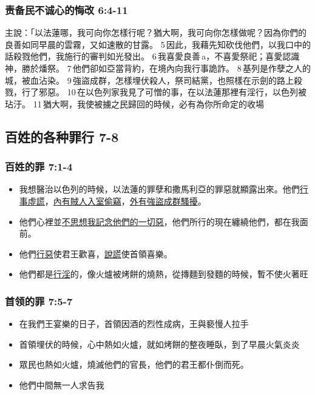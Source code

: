 \subsubsection{责备民不诚心的悔改 6:4-11}
主說：「以法蓮哪，我可向你怎樣行呢？猶大啊，我可向你怎樣做呢？因為你們的良善如同早晨的雲霧，又如速散的甘露。 5 因此，我藉先知砍伐他們，以我口中的話殺戮他們，我施行的審判如光發出。 6 我喜愛良善 a，不喜愛祭祀；喜愛認識神，勝於燔祭。 7 他們卻如亞當背約，在境內向我行事詭詐。 8 基列是作孽之人的城，被血沾染。 9 強盜成群，怎樣埋伏殺人，祭司結黨，也照樣在示劍的路上殺戮，行了邪惡。 10 在以色列家我見了可憎的事，在以法蓮那裡有淫行，以色列被玷汙。 11 猶大啊，我使被擄之民歸回的時候，必有為你所命定的收場


\subsection{百姓的各种罪行 7-8}
\subsubsection{百姓的罪 7:1-4}
\begin{itemize}
\itemsep-.45em  
\item 我想醫治以色列的時候，以法蓮的罪孽和撒馬利亞的罪惡就顯露出來。他們\underline{行事虛謊}，\underline{內有賊人入室偷竊}，\underline{外有強盜成群騷擾}。
\item 他們心裡並\underline{不思想我記念他們的一切惡}，他們所行的現在纏繞他們，都在我面前。 
\item 他們\underline{行惡}使君王歡喜，\underline{說謊}使首領喜樂。
\item 他們都是\underline{行淫}的，像火爐被烤餅的燒熱，從摶麵到發麵的時候，暫不使火著旺
\end{itemize}

\subsubsection{首领的罪  7:5-7}
\begin{itemize}
\itemsep-.45em  
\item 在我們王宴樂的日子，首領因酒的烈性成病，王與褻慢人拉手
\item 首領埋伏的時候，心中熱如火爐，就如烤餅的整夜睡臥，到了早晨火氣炎炎 
\item 眾民也熱如火爐，燒滅他們的官長，他們的君王都仆倒而死。
\item 他們中間無一人求告我
\end{itemize}

